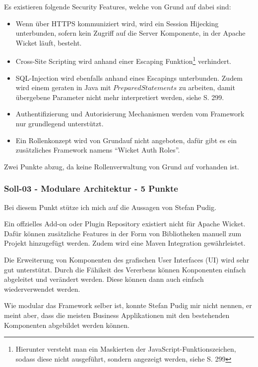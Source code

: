   Es existieren folgende Security Features, welche von Grund auf dabei sind:
  
  \begin{itemize}
    \item Wenn über HTTPS kommuniziert wird, wird ein Session Hijecking
    unterbunden, sofern kein Zugriff auf die Server Komponente, in der Apache
    Wicket läuft, besteht.
    \item Cross-Site Scripting wird anhand einer Escaping
    Funktion\footnote{Hierunter versteht man ein Maskierten der
    JavaScript-Funktionszeichen, sodass diese nicht ausgeführt, sondern
    angezeigt werden, siehe \cite{Wicket} S. 299} verhindert.
    \item SQL-Injection wird ebenfalls anhand eines Escapings unterbunden. Zudem
    wird einem geraten in Java mit \(PreparedStatements\) zu arbeiten, damit
    übergebene Parameter nicht mehr interpretiert werden, siehe \cite{Wicket} S.
    299.
    \item Authentifizierung und Autorisierung Mechanismen werden vom Framework
    nur grundlegend unterstützt. 
    \item Ein Rollenkonzept wird von Grundauf nicht angeboten, dafür gibt es ein
    zusätzliches Framework namens ``Wicket Auth Roles''. 
  \end{itemize}
  
  \noindent
  Zwei Punkte abzug, da keine Rollenverwaltung von Grund auf vorhanden ist.
  
  \subsubsection{Soll-03 - Modulare Architektur - 5 Punkte}
  
  Bei diesem Punkt stütze ich mich auf die Aussagen von Stefan Pudig.
  
  Ein offzielles Add-on oder Plugin Repository existiert nicht für Apache
  Wicket. Dafür können zusätzliche Features in der Form von Bibliotheken manuell
  zum Projekt hinzugefügt werden. Zudem wird eine Maven Integration
  gewährleistet.
  
  Die Erweiterung von Komponenten des grafischen User Interfaces (UI) wird sehr
  gut unterstützt. Durch die Fähikeit des Vererbens können Konponenten einfach
  abgeleitet und verändert werden. Diese können dann auch einfach
  wiederverwendet werden.
  
  Wie modular das Framework selber ist, konnte Stefan Pudig mir nicht nennen, er
  meint aber, dass die meisten Business Applikationen mit den bestehenden
  Komponenten abgebildet werden können.
  
